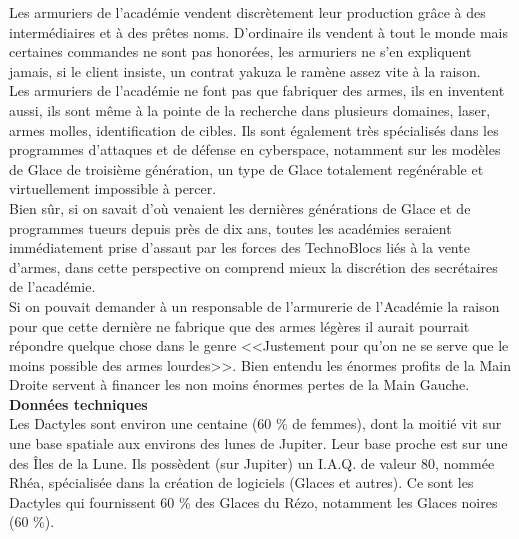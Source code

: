\documentclass[11pt,twoside,a4paper]{article}
\begin{document}
\begin{multicols}{3}
{\columnbreak

Les armuriers de l'acad{\'e}mie vendent discr{\`e}tement leur production gr{\^a}ce {\`a} des interm{\'e}diaires et {\`a} des pr{\^e}tes noms. D'ordinaire ils vendent {\`a} tout le monde mais certaines commandes ne sont pas honor{\'e}es, les armuriers ne s'en expliquent jamais, si le client insiste, un contrat yakuza le ram{\`e}ne assez vite {\`a} la raison.~\\
 
Les armuriers de l'acad{\'e}mie ne font pas que fabriquer des armes, ils en inventent aussi, ils sont m{\^e}me {\`a} la pointe de la recherche dans plusieurs domaines, laser, armes molles, identification de cibles. Ils sont {\'e}galement tr{\`e}s sp{\'e}cialis{\'e}s dans les programmes d'attaques et de d{\'e}fense en cyberspace, notamment sur les mod{\`e}les de Glace de troisi{\`e}me g{\'e}n{\'e}ration, un type de Glace totalement reg{\'e}n{\'e}rable et virtuellement impossible {\`a} percer.~\\
 
Bien s{\^u}r, si on savait d'o{\`u} venaient les derni{\`e}res g{\'e}n{\'e}rations de Glace et de programmes tueurs depuis pr{\`e}s de dix ans, toutes les acad{\'e}mies seraient imm{\'e}diatement prise d'assaut par les forces des TechnoBlocs li{\'e}s {\`a} la vente d'armes, dans cette perspective on comprend mieux la discr{\'e}tion des secr{\'e}taires de l'acad{\'e}mie.~\\
 
Si on pouvait demander {\`a} un responsable de l'armurerie de l'Acad{\'e}mie la raison pour que cette derni{\`e}re ne fabrique que des armes l{\'e}g{\`e}res il aurait pourrait r{\'e}pondre quelque chose dans le genre <<Justement pour qu'on ne se serve que le moins possible des armes lourdes>>. Bien entendu les {\'e}normes profits de la Main Droite servent {\`a} financer les non moins {\'e}normes pertes de la Main Gauche.~\\

\textbf{Donn{\'e}es techniques}~\\

Les Dactyles sont environ une centaine (60 \% de femmes), dont la moiti{\'e} vit sur une base spatiale aux environs des lunes de Jupiter. Leur base proche est sur une des {\^I}les de la Lune. Ils poss{\`e}dent (sur Jupiter) un I.A.Q. de valeur 80, nomm{\'e}e Rh{\'e}a, sp{\'e}cialis{\'e}e dans la cr{\'e}ation de logiciels (Glaces et autres). Ce sont les Dactyles qui fournissent 60 \% des Glaces du R{\'e}zo, notamment les Glaces noires (60 \%).~\\

}
\end{multicols}
\end{document}
